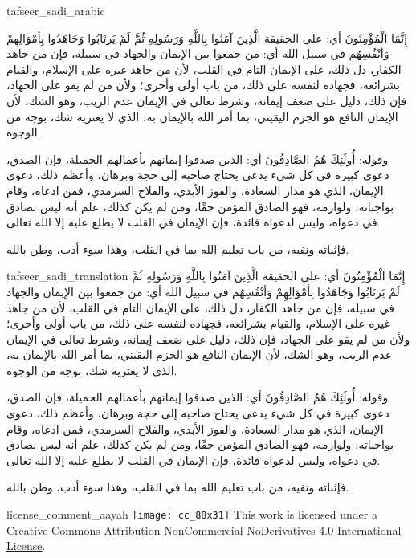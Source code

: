 \begin{taggedblock}{tafseer_sadi_arabic}
\begin{Arabic}
{ إِنَّمَا الْمُؤْمِنُونَ }
أي: على الحقيقة
{ الَّذِينَ آمَنُوا بِاللَّهِ وَرَسُولِهِ ثُمَّ لَمْ يَرتَابُوا وَجَاهَدُوا بِأمْوَالِهِمْ وَأنْفُسِهُم في سبيل الله }
أي: من جمعوا بين الإيمان والجهاد في سبيله، فإن من جاهد الكفار، دل ذلك، على الإيمان التام في القلب، لأن من جاهد غيره على الإسلام، والقيام بشرائعه، فجهاده لنفسه على ذلك، من باب أولى وأحرى؛ ولأن من لم يقو على الجهاد، فإن ذلك، دليل على ضعف إيمانه، وشرط تعالى في الإيمان عدم الريب، وهو الشك، لأن الإيمان النافع هو الجزم اليقيني، بما أمر الله بالإيمان به، الذي لا يعتريه شك، بوجه من الوجوه.

وقوله:
{ أُولَئِكَ هُمُ الصَّادِقُونَ }
أي: الذين صدقوا إيمانهم بأعمالهم الجميلة، فإن الصدق، دعوى كبيرة في كل شيء يدعى يحتاج صاحبه إلى حجة وبرهان، وأعظم ذلك، دعوى الإيمان، الذي هو مدار السعادة، والفوز الأبدي، والفلاح السرمدي، فمن ادعاه، وقام بواجباته، ولوازمه، فهو الصادق المؤمن حقًا، ومن لم يكن كذلك، علم أنه ليس بصادق في دعواه، وليس لدعواه فائدة، فإن الإيمان في القلب لا يطلع عليه إلا الله تعالى.

فإثباته ونفيه، من باب تعليم الله بما في القلب، وهذا سوء أدب، وظن بالله.
\end{Arabic}
\end{taggedblock}
\begin{taggedblock}{tafseer_sadi_translation}
{ إِنَّمَا الْمُؤْمِنُونَ }
أي: على الحقيقة
{ الَّذِينَ آمَنُوا بِاللَّهِ وَرَسُولِهِ ثُمَّ لَمْ يَرتَابُوا وَجَاهَدُوا بِأمْوَالِهِمْ وَأنْفُسِهُم في سبيل الله }
أي: من جمعوا بين الإيمان والجهاد في سبيله، فإن من جاهد الكفار، دل ذلك، على الإيمان التام في القلب، لأن من جاهد غيره على الإسلام، والقيام بشرائعه، فجهاده لنفسه على ذلك، من باب أولى وأحرى؛ ولأن من لم يقو على الجهاد، فإن ذلك، دليل على ضعف إيمانه، وشرط تعالى في الإيمان عدم الريب، وهو الشك، لأن الإيمان النافع هو الجزم اليقيني، بما أمر الله بالإيمان به، الذي لا يعتريه شك، بوجه من الوجوه.

وقوله:
{ أُولَئِكَ هُمُ الصَّادِقُونَ }
أي: الذين صدقوا إيمانهم بأعمالهم الجميلة، فإن الصدق، دعوى كبيرة في كل شيء يدعى يحتاج صاحبه إلى حجة وبرهان، وأعظم ذلك، دعوى الإيمان، الذي هو مدار السعادة، والفوز الأبدي، والفلاح السرمدي، فمن ادعاه، وقام بواجباته، ولوازمه، فهو الصادق المؤمن حقًا، ومن لم يكن كذلك، علم أنه ليس بصادق في دعواه، وليس لدعواه فائدة، فإن الإيمان في القلب لا يطلع عليه إلا الله تعالى.

فإثباته ونفيه، من باب تعليم الله بما في القلب، وهذا سوء أدب، وظن بالله.
\end{taggedblock}
\begin{taggedblock}{license_comment_aayah}
\texttt{[image: cc\_88x31]}
This work is licensed under a 
\href{http://creativecommons.org/licenses/by-nc-nd/4.0/}{Creative Commons Attribution-NonCommercial-NoDerivatives 4.0 International License}.
\end{taggedblock}
\begin{comment}
Please use the following for footnotes:- Sample\footnoteQ{Text of Qur'an footnote goes here.}.
Sample\footnoteT{Text of Tafseer footnote goes here.}.
\end{comment}
